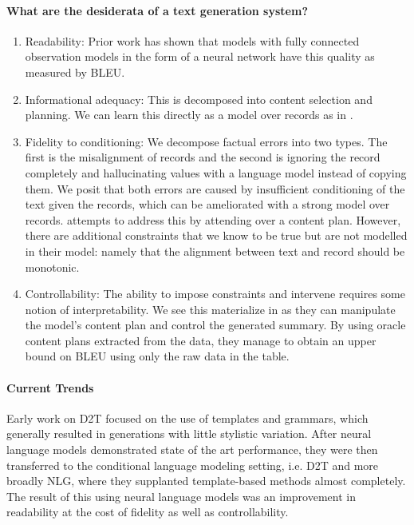 \documentclass[11pt]{article}
\begin{document}
\paragraph{What are the desiderata of a text generation system?}
\begin{enumerate}
\item Readability: Prior work has shown that models with fully connected observation models
in the form of a neural network have this quality \citep{wiseman2017d2t} as measured by BLEU.
\item Informational adequacy: This is decomposed into content selection and planning.
We can learn this directly as a model over
records as in \citep{puduppully2018contentselection}.
\item Fidelity to conditioning: We decompose factual errors into two types.
The first is the misalignment of records and the second is ignoring the record
completely and hallucinating values with a language model instead of copying them.
We posit that both errors are caused by insufficient conditioning of the
text given the records, which can be ameliorated with a strong model over records.
\citep{puduppully2018contentselection} attempts to address this by
attending over a content plan.
However, there are additional constraints that we know to be true
but are not modelled in their model:
namely that the alignment between text and record should be monotonic.
\item Controllability: The ability to impose constraints and intervene
requires some notion of interpretability.
We see this materialize in \citep{puduppully2018contentselection}
as they can manipulate the model's content plan and control the generated summary.
By using oracle content plans extracted from the data,
they manage to obtain an upper bound on BLEU using only the raw data in the table.
\end{enumerate}

\paragraph{Current Trends}
Early work on D2T focused on the use of templates and grammars, 
which generally resulted in generations with little stylistic variation.
After neural language models demonstrated state of the art performance,
they were then transferred to the conditional language modeling setting,
i.e. D2T and more broadly NLG,
where they supplanted template-based methods almost completely.
The result of this using neural language models was an improvement in readability
at the cost of fidelity as well as controllability.
\end{document}

